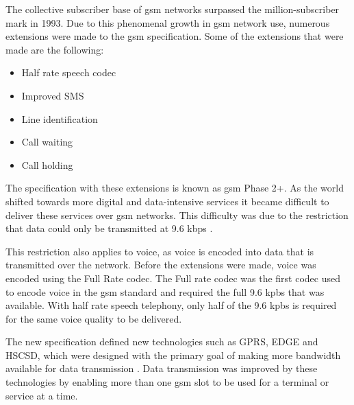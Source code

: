 The collective subscriber base of \gls{gsm} networks surpassed the million-subscriber mark in 1993\cite{GSM92}. Due to this phenomenal growth in \gls{gsm} network use, numerous extensions were made to the \gls{gsm} specification. 
Some of the extensions that were made are the following\cite{GSM92,GSMArchitectureProtocolsServices}:
\begin{itemize}
\item Half rate speech codec
\item Improved SMS
\item Line identification
\item Call waiting
\item Call holding
\end{itemize}
The specification with these extensions is known as \gls{gsm} Phase 2+. As the world shifted towards more digital and data-intensive services it became difficult to deliver these services over \gls{gsm} networks. This difficulty was due to the restriction that data could only be transmitted at 9.6 kbps \cite{GSM92,Karen2004}. 

This restriction also applies to voice, as voice is encoded into data that is transmitted over the network\cite{Karen2004, GSM92}. Before the extensions were made, voice was encoded using the Full Rate codec\cite{GSMArchitectureProtocolsServices}. The Full rate codec was the first codec used to encode voice in the \gls{gsm} standard and required the full 9.6 kpbs that was available\cite{GSMArchitectureProtocolsServices}. With half rate speech telephony, only half of the 9.6 kpbs is required for the same voice quality to be delivered\cite{GSMArchitectureProtocolsServices}.  

The new specification defined new technologies such as GPRS, EDGE and HSCSD, which were designed with the primary goal of making more bandwidth available for data transmission \cite{GSMArchitectureProtocolsServices,Karen2004}. Data transmission was improved by these technologies by enabling more than one \gls{gsm} slot to be used for a terminal or service at a time\cite{GSMArchitectureProtocolsServices,Karen2004}.

